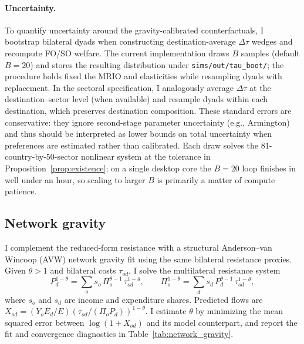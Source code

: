 \documentclass[12pt]{article}
\begin{document}
\paragraph{Uncertainty.} To quantify uncertainty around the gravity-calibrated counterfactuals, I bootstrap bilateral dyads when constructing destination-average $\Delta\tau$ wedges and recompute FO/SO welfare. The current implementation draws $B$ samples (default $B=20$) and stores the resulting distribution under \texttt{sims/out/tau\_boot/}; the procedure holds fixed the MRIO and elasticities while resampling dyads with replacement. In the sectoral specification, I analogously average $\Delta\tau$ at the destination--sector level (when available) and resample dyads within each destination, which preserves destination composition. These standard errors are conservative: they ignore second-stage parameter uncertainty (e.g., Armington) and thus should be interpreted as lower bounds on total uncertainty when preferences are estimated rather than calibrated. Each draw solves the 81-country-by-50-sector nonlinear system at the tolerance in Proposition~\ref{prop:existence}; on a single desktop core the $B=20$ loop finishes in well under an hour, so scaling to larger $B$ is primarily a matter of compute patience.

\subsection{Network gravity}
I complement the reduced-form resistance with a structural Anderson--van Wincoop (AVW) network gravity fit using the same bilateral resistance proxies. Given $\theta>1$ and bilateral costs $\tau_{od}$, I solve the multilateral resistance system
\begin{equation}
P_d^{1-\theta} = \sum_o s_o \, \Pi_o^{\theta-1} \, \tau_{od}^{1-\theta},\qquad
\Pi_o^{1-\theta} = \sum_d s_d \, P_d^{\theta-1} \, \tau_{od}^{1-\theta},
\end{equation}
where $s_o$ and $s_d$ are income and expenditure shares. Predicted flows are $X_{od}=(Y_o E_d/E) (\tau_{od}/(\Pi_o P_d))^{1-\theta}$. I estimate $\theta$ by minimizing the mean squared error between $\log(1+X_{od})$ and its model counterpart, and report the fit and convergence diagnostics in Table~\ref{tab:network_gravity}.
\end{document}
